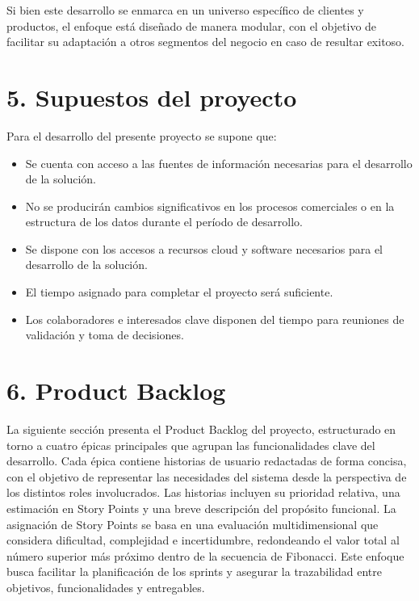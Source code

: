 \documentclass[
11pt, %
]{charter}
\begin{document}
Si bien este desarrollo se enmarca en un universo específico de clientes y productos, el enfoque está diseñado de manera modular, con el objetivo de facilitar su adaptación a otros segmentos del negocio en caso de resultar exitoso.

\section{5. Supuestos del proyecto}
\label{sec:supuestos}

Para el desarrollo del presente proyecto se supone que: 
\begin{itemize}
	\item Se cuenta con acceso a las fuentes de información necesarias para el desarrollo de la solución. 
        \item No se producirán cambios significativos en los procesos comerciales o en la estructura de los datos durante el período de desarrollo.
	\item Se dispone con los accesos a recursos cloud y software necesarios para el desarrollo de la solución. 
	\item El tiempo asignado para completar el proyecto será suficiente.
        \item Los colaboradores e interesados clave disponen del tiempo para reuniones de validación y toma de decisiones.
\end{itemize}

\section{6. Product Backlog}
\label{sec:backlog}

La siguiente sección presenta el Product Backlog del proyecto, estructurado en torno a cuatro épicas principales que agrupan las funcionalidades clave del desarrollo. Cada épica contiene historias de usuario redactadas de forma concisa, con el objetivo de representar las necesidades del sistema desde la perspectiva de los distintos roles involucrados. Las historias incluyen su prioridad relativa, una estimación en Story Points y una breve descripción del propósito funcional. La asignación de Story Points se basa en una evaluación multidimensional que considera dificultad, complejidad e incertidumbre, redondeando el valor total al número superior más próximo dentro de la secuencia de Fibonacci. Este enfoque busca facilitar la planificación de los sprints y asegurar la trazabilidad entre objetivos, funcionalidades y entregables.
\end{document}
